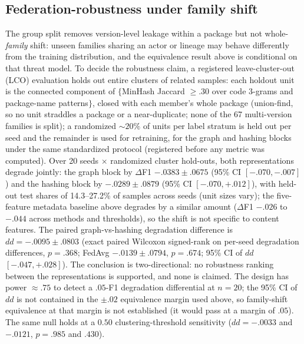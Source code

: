 \documentclass[sigconf,nonacm]{acmart}
\begin{document}
\subsection{Federation-robustness under family shift}\label{sec:lco}
The group split removes version-level leakage within a package but not
whole-\emph{family} shift: unseen families sharing an actor or lineage
may behave differently from the training distribution, and the equivalence
result above is conditional on that threat model. To decide the
robustness claim, a registered leave-cluster-out (LCO) evaluation holds
out entire clusters of related samples: each holdout unit is the
connected component of $\{$MinHash Jaccard ${\ge}.30$ over code 3-grams
and package-name patterns$\}$, closed with each member's whole package
(union-find, so no unit straddles a package or a near-duplicate; none of
the 67 multi-version families is split); a randomized ${\sim}20\%$ of
units per label stratum is held out per seed and the remainder is used
for retraining, for the graph and hashing blocks under the same
standardized protocol (registered before any metric was computed). Over
20 seeds $\times$ randomized cluster hold-outs, both representations
degrade jointly: the graph block by $\Delta$F1 $-.0383{\pm}.0675$
(95\% CI $[-.070,-.007]$) and the hashing block by $-.0289{\pm}.0879$
(95\% CI $[-.070,+.012]$), with held-out test shares of 14.3--27.2\% of
samples across seeds (unit sizes vary); the five-feature metadata
baseline above degrades by a similar amount ($\Delta$F1 $-.026$ to
$-.044$ across methods and thresholds), so the shift is not specific to
content features. The paired graph-vs-hashing degradation difference is
$dd{=}{-.0095}{\pm}{.0803}$ (exact paired Wilcoxon signed-rank on
per-seed degradation differences, $p{=}.368$; FedAvg
$-.0139{\pm}.0794$, $p{=}.674$; 95\% CI of $dd$ $[-.047,+.028]$). The
conclusion is two-directional: no robustness ranking between the
representations is supported, and none is claimed. The design has power
${\approx}.75$ to detect a $.05$-F1 degradation differential at
$n{=}20$; the 95\% CI of $dd$ is not contained in the $\pm.02$
equivalence margin used above, so family-shift equivalence at that
margin is not established (it would pass at a margin of $.05$). The
same null holds at a $0.50$ clustering-threshold sensitivity
($dd{=}{-.0033}$ and $-.0121$, $p{=}.985$ and $.430$).
\end{document}
